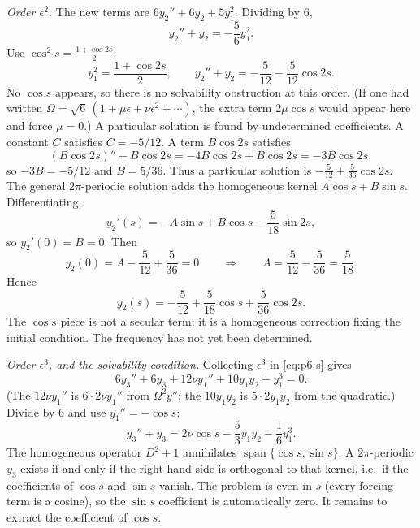 \documentclass[11pt,a4paper]{article}
\begin{document}
\emph{Order \(\epsilon^{2}\).}
The new terms are \(6y_{2}''+6y_{2}+5y_{1}^{2}\). Dividing by \(6\),
\[
y_{2}''+y_{2}
=
-\frac56 y_{1}^{2}.
\]
Use \(\cos^{2}s=\frac{1+\cos 2s}{2}\):
\[
y_{1}^{2}
=
\frac{1+\cos 2s}{2},
\qquad
y_{2}''+y_{2}
=
-\frac{5}{12}-\frac{5}{12}\cos 2s.
\]
No \(\cos s\) appears, so there is no solvability obstruction at this order. (If one had written \(\Omega=\sqrt{6}\,(1+\mu\epsilon+\nu\epsilon^{2}+\cdots)\), the extra term \(2\mu\cos s\) would appear here and force \(\mu=0\).) A particular solution is found by undetermined coefficients. A constant \(C\) satisfies \(C=-5/12\). A term \(B\cos 2s\) satisfies
\[
(B\cos 2s)''+B\cos 2s
=
-4B\cos 2s+B\cos 2s
=
-3B\cos 2s,
\]
so \(-3B=-5/12\) and \(B=5/36\). Thus a particular solution is \(-\frac{5}{12}+\frac{5}{36}\cos 2s\). The general \(2\pi\)-periodic solution adds the homogeneous kernel \(A\cos s+B\sin s\). Differentiating,
\[
y_{2}'(s)
=
-A\sin s+B\cos s-\frac{5}{18}\sin 2s,
\]
so \(y_{2}'(0)=B=0\). Then
\[
y_{2}(0)
=
A-\frac{5}{12}+\frac{5}{36}
=
0
\qquad\Longrightarrow\qquad
A
=
\frac{5}{12}-\frac{5}{36}
=
\frac{5}{18}.
\]
Hence
\begin{equation}
\label{eq:p6-y2}
y_{2}(s)
=
-\frac{5}{12}+\frac{5}{18}\cos s+\frac{5}{36}\cos 2s.
\end{equation}
The \(\cos s\) piece is not a secular term: it is a homogeneous correction fixing the initial condition. The frequency has not yet been determined.

\emph{Order \(\epsilon^{3}\), and the solvability condition.}
Collecting \(\epsilon^{3}\) in \eqref{eq:p6-s} gives
\[
6y_{3}''+6y_{3}+12\nu y_{1}''+10 y_{1}y_{2}+y_{1}^{3}=0.
\]
(The \(12\nu y_{1}''\) is \(6\cdot 2\nu y_{1}''\) from \(\Omega^{2}y''\); the \(10 y_{1}y_{2}\) is \(5\cdot 2 y_{1}y_{2}\) from the quadratic.) Divide by \(6\) and use \(y_{1}''=-\cos s\):
\begin{equation}
\label{eq:p6-y3}
y_{3}''+y_{3}
=
2\nu\cos s-\frac53 y_{1}y_{2}-\frac16 y_{1}^{3}.
\end{equation}
The homogeneous operator \(D^{2}+1\) annihilates \(\operatorname{span}\{\cos s,\sin s\}\). A \(2\pi\)-periodic \(y_{3}\) exists if and only if the right-hand side is orthogonal to that kernel, i.e.\ if the coefficients of \(\cos s\) and \(\sin s\) vanish. The problem is even in \(s\) (every forcing term is a cosine), so the \(\sin s\) coefficient is automatically zero. It remains to extract the coefficient of \(\cos s\).
\end{document}
